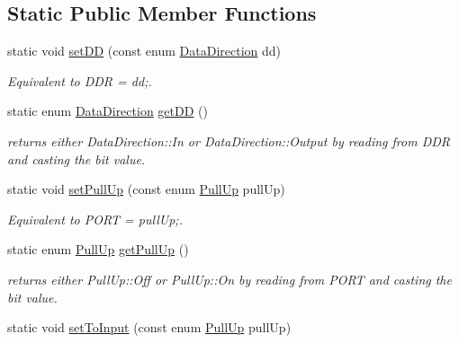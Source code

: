 \subsection*{Static Public Member Functions}
\begin{DoxyCompactItemize}
\item 
static void \hyperlink{structports_1_1Pin_a0ab0631ab14e62fd6f131005e96c298c}{set\+DD} (const enum \hyperlink{namespaceports_a46987e78fa447129742fadda5eccafb4}{Data\+Direction} dd)\hypertarget{structports_1_1Pin_a0ab0631ab14e62fd6f131005e96c298c}{}\label{structports_1_1Pin_a0ab0631ab14e62fd6f131005e96c298c}

\begin{DoxyCompactList}\small\item\em Equivalent to {\ttfamily D\+DR = dd;}. \end{DoxyCompactList}\item 
static enum \hyperlink{namespaceports_a46987e78fa447129742fadda5eccafb4}{Data\+Direction} \hyperlink{structports_1_1Pin_a7aabcc753e62bd94ee9a8186e9d050ab}{get\+DD} ()\hypertarget{structports_1_1Pin_a7aabcc753e62bd94ee9a8186e9d050ab}{}\label{structports_1_1Pin_a7aabcc753e62bd94ee9a8186e9d050ab}

\begin{DoxyCompactList}\small\item\em returns either Data\+Direction\+::\+In or Data\+Direction\+::\+Output by reading from D\+DR and casting the bit value. \end{DoxyCompactList}\item 
static void \hyperlink{structports_1_1Pin_a11ba9e7aeda2d867780dee32234f2c7e}{set\+Pull\+Up} (const enum \hyperlink{namespaceports_a49bf0ccedb4cfed89a328574e53bec07}{Pull\+Up} pull\+Up)\hypertarget{structports_1_1Pin_a11ba9e7aeda2d867780dee32234f2c7e}{}\label{structports_1_1Pin_a11ba9e7aeda2d867780dee32234f2c7e}

\begin{DoxyCompactList}\small\item\em Equivalent to {\ttfamily P\+O\+RT = pull\+Up;}. \end{DoxyCompactList}\item 
static enum \hyperlink{namespaceports_a49bf0ccedb4cfed89a328574e53bec07}{Pull\+Up} \hyperlink{structports_1_1Pin_a5a5e3c8e256954043d749752859ea300}{get\+Pull\+Up} ()\hypertarget{structports_1_1Pin_a5a5e3c8e256954043d749752859ea300}{}\label{structports_1_1Pin_a5a5e3c8e256954043d749752859ea300}

\begin{DoxyCompactList}\small\item\em returns either Pull\+Up\+::\+Off or Pull\+Up\+::\+On by reading from P\+O\+RT and casting the bit value. \end{DoxyCompactList}\item 
static void \hyperlink{structports_1_1Pin_ae2f380ea5586a2eaa6e0d0b85dbf0983}{set\+To\+Input} (const enum \hyperlink{namespaceports_a49bf0ccedb4cfed89a328574e53bec07}{Pull\+Up} pull\+Up)\hypertarget{structports_1_1Pin_ae2f380ea5586a2eaa6e0d0b85dbf0983}{}\label{structports_1_1Pin_ae2f380ea5586a2eaa6e0d0b85dbf0983}


\end{DoxyCompactItemize}
